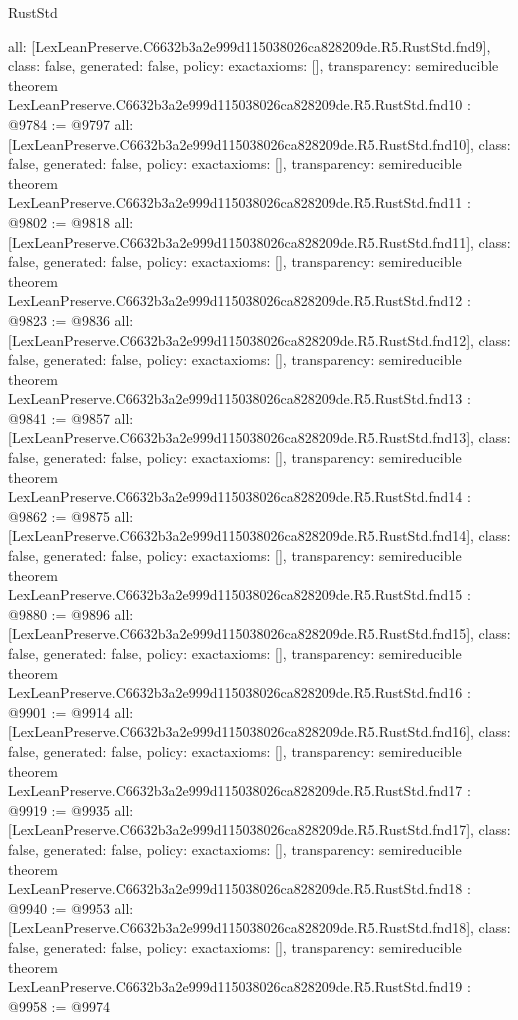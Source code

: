 \begin{lexlean}{RustStd}
\begin{coremodule}
{  all: [LexLeanPreserve.C6632b3a2e999d115038026ca828209de.R5.RustStd.fnd9],
  class: false,
  generated: false,
  policy: exact{axioms: []},
  transparency: semireducible
}
theorem LexLeanPreserve.C6632b3a2e999d115038026ca828209de.R5.RustStd.fnd10 : @9784 := @9797 {
  all: [LexLeanPreserve.C6632b3a2e999d115038026ca828209de.R5.RustStd.fnd10],
  class: false,
  generated: false,
  policy: exact{axioms: []},
  transparency: semireducible
}
theorem LexLeanPreserve.C6632b3a2e999d115038026ca828209de.R5.RustStd.fnd11 : @9802 := @9818 {
  all: [LexLeanPreserve.C6632b3a2e999d115038026ca828209de.R5.RustStd.fnd11],
  class: false,
  generated: false,
  policy: exact{axioms: []},
  transparency: semireducible
}
theorem LexLeanPreserve.C6632b3a2e999d115038026ca828209de.R5.RustStd.fnd12 : @9823 := @9836 {
  all: [LexLeanPreserve.C6632b3a2e999d115038026ca828209de.R5.RustStd.fnd12],
  class: false,
  generated: false,
  policy: exact{axioms: []},
  transparency: semireducible
}
theorem LexLeanPreserve.C6632b3a2e999d115038026ca828209de.R5.RustStd.fnd13 : @9841 := @9857 {
  all: [LexLeanPreserve.C6632b3a2e999d115038026ca828209de.R5.RustStd.fnd13],
  class: false,
  generated: false,
  policy: exact{axioms: []},
  transparency: semireducible
}
theorem LexLeanPreserve.C6632b3a2e999d115038026ca828209de.R5.RustStd.fnd14 : @9862 := @9875 {
  all: [LexLeanPreserve.C6632b3a2e999d115038026ca828209de.R5.RustStd.fnd14],
  class: false,
  generated: false,
  policy: exact{axioms: []},
  transparency: semireducible
}
theorem LexLeanPreserve.C6632b3a2e999d115038026ca828209de.R5.RustStd.fnd15 : @9880 := @9896 {
  all: [LexLeanPreserve.C6632b3a2e999d115038026ca828209de.R5.RustStd.fnd15],
  class: false,
  generated: false,
  policy: exact{axioms: []},
  transparency: semireducible
}
theorem LexLeanPreserve.C6632b3a2e999d115038026ca828209de.R5.RustStd.fnd16 : @9901 := @9914 {
  all: [LexLeanPreserve.C6632b3a2e999d115038026ca828209de.R5.RustStd.fnd16],
  class: false,
  generated: false,
  policy: exact{axioms: []},
  transparency: semireducible
}
theorem LexLeanPreserve.C6632b3a2e999d115038026ca828209de.R5.RustStd.fnd17 : @9919 := @9935 {
  all: [LexLeanPreserve.C6632b3a2e999d115038026ca828209de.R5.RustStd.fnd17],
  class: false,
  generated: false,
  policy: exact{axioms: []},
  transparency: semireducible
}
theorem LexLeanPreserve.C6632b3a2e999d115038026ca828209de.R5.RustStd.fnd18 : @9940 := @9953 {
  all: [LexLeanPreserve.C6632b3a2e999d115038026ca828209de.R5.RustStd.fnd18],
  class: false,
  generated: false,
  policy: exact{axioms: []},
  transparency: semireducible
}
theorem LexLeanPreserve.C6632b3a2e999d115038026ca828209de.R5.RustStd.fnd19 : @9958 := @9974 {
}
\end{coremodule}
\end{lexlean}
